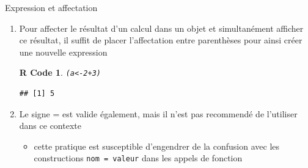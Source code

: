 \documentclass[11pt]{beamer}\usepackage[]{graphicx}\usepackage[]{color}
\makeatletter
\newcommand{\hlnum}[1]{\textcolor[rgb]{0.063,0.58,0.627}{#1}}%
\newcommand{\hlopt}[1]{\textcolor[rgb]{0.196,0.196,0.196}{#1}}%
\newcommand{\hlstd}[1]{\textcolor[rgb]{0.196,0.196,0.196}{#1}}%
\newcommand{\hlkwb}[1]{\textcolor[rgb]{0.627,0,0.314}{#1}}%
\newenvironment{kframe}{%
 \def\at@end@of@kframe{}%
 \ifinner\ifhmode%
  \def\at@end@of@kframe{\end{minipage}}%
  \begin{minipage}{\columnwidth}%
 \fi\fi%
 \def\FrameCommand##1{\hskip\@totalleftmargin \hskip-\fboxsep
 \colorbox{shadecolor}{##1}\hskip-\fboxsep
     \hskip-\linewidth \hskip-\@totalleftmargin \hskip\columnwidth}%
 \MakeFramed {\advance\hsize-\width
   \@totalleftmargin\z@ \linewidth\hsize
   \@setminipage}}%
 {\par\unskip\endMakeFramed%
 \at@end@of@kframe}
\newenvironment{knitrout}{}{} %
\newtheorem{rcode}{R Code}[section]
\newcommand{\code}[1]{\texttt{#1}}
\newcounter{saveenumi}
\newcommand{\conti}{\setcounter{enumi}{\value{saveenumi}}}
\makeatother
\begin{document}
\begin{frame}[fragile]{Expression et affectation} 
\begin{enumerate}
\conti
\item Pour affecter le résultat d’un calcul dans un objet et simultanément afficher ce résultat, il suffit de placer l'affectation entre parenthèses pour ainsi créer une nouvelle expression
\pause
\begin{knitrout}
\color{fgcolor}\begin{kframe}
\begin{rcode}\begin{alltt}
\hlstd{(a} \hlkwb{<-} \hlnum{2} \hlopt{+} \hlnum{3}\hlstd{)}
\end{alltt}
\begin{verbatim}
## [1] 5
\end{verbatim}
\end{rcode}\end{kframe}
\end{knitrout}
\pause \item Le signe = est valide également, mais il n'est pas recommendé de l'utiliser dans ce contexte
\begin{itemize}
\item cette pratique est susceptible d'engendrer de la confusion avec les constructions \code{nom = valeur} dans les appels de fonction
\end{itemize}

\end{enumerate}

\end{frame}
\end{document}
